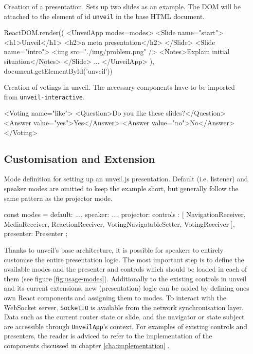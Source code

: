 \begin{program}
\caption{Creation of a presentation. Sets up two slides as an example. The DOM will be attached to the element of id \texttt{unveil} in the base HTML document.}
\label{prog:usage-presentation-creation}
\begin{JsCode}
ReactDOM.render((
  <UnveilApp modes={modes}>
    <Slide name="start">
      <h1>Unveil</h1>
      <h2>a meta presentation</h2>
    </Slide>
    <Slide name="intro">
      <img src="./img/problem.png" />
      <Notes>Explain initial situation</Notes>
    </Slide>
    ...
  </UnveilApp>
), document.getElementById('unveil'))
\end{JsCode}
\end{program}


\begin{program}
\caption{Creation of votings in unveil. The necessary components have to be imported from \texttt{unveil-interactive}.}
\label{prog:usage-voting}
\begin{JsCode}
<Voting name="like">
  <Question>Do you like these slides?</Question>
  <Answer value="yes">Yes</Answer>
  <Answer value="no">No</Answer>
</Voting>
\end{JsCode}
\end{program}

\subsection{Customisation and Extension}
\label{sec:usage-customisation}

\begin{program}
\caption{Mode definition for setting up an unveil.js presentation. Default (i.e. listener) and speaker modes are omitted to keep the example short, but generally follow the same pattern as the projector mode.}
\label{fig:usage-modes}
\begin{JsCode}
const modes = {
  default: {...},
  speaker: {...},
  projector: {
    controls : [
      NavigationReceiver, MediaReceiver, ReactionReceiver,
      VotingNavigatableSetter, VotingReceiver
    ],
    presenter: Presenter
  }
};
\end{JsCode}
\end{program}

Thanks to unveil's base architecture, it is possible for speakers to entirely customise the entire presentation logic. The most important step is to define the available modes and the presenter and controls which should be loaded in each of them (see figure \ref{fig:usage-modes}). Additionally to the existing controls in unveil and its current extensions, new (presentation) logic can be added by defining ones own React components and assigning them to modes. To interact with the WebSocket server, \texttt{SocketIO} is available from the network synchronisation layer. Data such as the current router state or slide, and the navigator or state subject are accessible through \texttt{UnveilApp}'s context. For examples of existing controls and presenters, the reader is adviced to refer to the implementation of the components discussed in chapter \ref{cha:implementation} \cite{unveil-fork, unveil-network-sync, unveil-interactive}.

